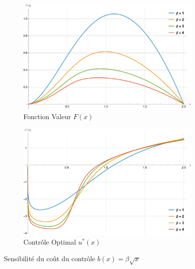\FloatBarrier\begin{figure}[htb]
    \centering
    \begin{subfigure}{0.49\linewidth}
        \includegraphics[width=\linewidth]{img/validation/P2/p2_B_value.pdf}
        \caption{Fonction Valeur $F(x)$}\label{fig:BetaValueVisualisation2}
    \end{subfigure}
    \hfill
    \begin{subfigure}{0.49\linewidth}
        \includegraphics[width=\linewidth]{img/validation/P2/p2_B_control.pdf}
        \caption{Contrôle Optimal $u^*(x)$}\label{fig:BetaControlVisualisation2}
    \end{subfigure}
    \caption{Sensibilité du coût du contrôle $b(x)=\beta \sqrt{x}$}\label{fig:BetaValueControlComparison1}
\end{figure}
